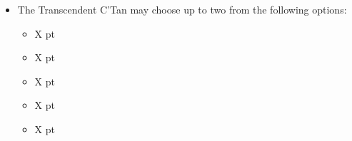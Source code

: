 \begin{minipage}[t]{0.72\textwidth}
\begin{itemize}
\begin{itemize}
			\item {} \dotfill X pt
			\item {} \dotfill X pt
			\item {} \dotfill X pt
			\item {} \dotfill X pt
			\item {} \dotfill X pt
		\end{itemize}
		\item The Transcendent C'Tan may choose up to two from the following options:
		\begin{itemize}
			\item {} \dotfill X pt
			\item {} \dotfill X pt
			\item {} \dotfill X pt
			\item {} \dotfill X pt
			\item {} \dotfill X pt
		\end{itemize}
	\end{itemize}
\end{minipage}



\newpage
\subsubsection[Transcendent C'Tan]{}

